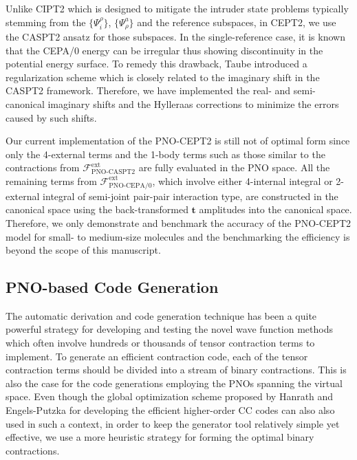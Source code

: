 \documentclass[aip,jcp,amsmath]{revtex4-1}
\begin{document}
%
Unlike CIPT2 which is designed to mitigate the intruder state problems typically stemming from the $\{\Psi_i^\rho\}$, $\{\Psi_\rho^a\}$ and the reference subspaces, in CEPT2, we use the CASPT2 ansatz for those subspaces.
%
In the single-reference case, it is known that the CEPA/0 energy can be irregular thus showing discontinuity in the potential energy surface.
%
To remedy this drawback, Taube introduced a regularization scheme which is closely related to the imaginary shift in the CASPT2 framework.\cite{doi:10.1063/1.3115467}
%
Therefore, we have implemented the real- and semi-canonical imaginary shifts and the Hylleraas corrections to minimize the errors caused by such shifts.

%
Our current implementation of the PNO-CEPT2 is still not of optimal form since only the 4-external terms and the 1-body terms such as those similar to the contractions from $\mathscr{F}_\text{PNO-CASPT2}^\text{ext}$ are fully evaluated in the PNO space.
%
All the remaining terms from $\mathscr{F}_\text{PNO-CEPA/0}^\text{ext}$, which involve either 4-internal integral or 2-external integral of semi-joint pair-pair interaction type,\cite{neeseefficient2009cepa,neeseefficient2009} are constructed in the canonical space using the back-transformed $\mathbf{t}$ amplitudes into the canonical space.
%
Therefore, we only demonstrate and benchmark the accuracy of the PNO-CEPT2 model for small- to medium-size molecules and the benchmarking the efficiency is beyond the scope of this manuscript.

\subsection{PNO-based Code Generation}
%
The automatic derivation and code generation technique has been a quite powerful strategy for developing and testing the novel wave function methods which often involve hundreds or thousands of tensor contraction terms to implement.\cite{CJanssen1991,doi:10.1021/jp034596z,SHirataTCE2004,SHirataTCE2006,doi:10.1080/00268970500275780,KoehnJCP2009_1,KoehnJCP2009_2,MHandKoehn2009,MHandKoehn2011,AK74,AK77,ShiozakiJCP2008,ShiozakiPCCP2008,ShiozakiJCP2009_1,ShiozakiJCP2009_2,doi:10.1063/1.4907717,doi:10.1063/1.4959029,doi:10.1002/jcc.24833,doi:10.1063/1.5001320,doi:10.1063/1.5048688,dattaa2011,doi:10.1063/1.3089302,doi:10.1063/1.3664729,PCMRCI2011}
%
To generate an efficient contraction code, each of the tensor contraction terms should be divided into a stream of binary contractions.
%
This is also the case for the code generations employing the PNOs spanning the virtual space.
%
Even though the global optimization scheme proposed by Hanrath and Engels-Putzka for developing the efficient higher-order CC codes\cite{hanrathan2010,engels-putzkaa2011} can also also used in such a context, in order to keep the generator tool relatively simple yet effective, we use a more heuristic strategy for forming the optimal binary contractions.
\end{document}

